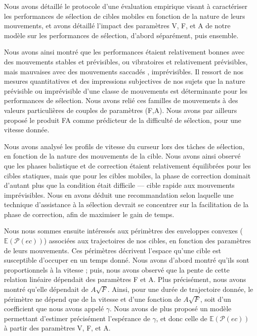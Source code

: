 	Nous avons détaillé le protocole d'une évaluation empirique visant à caractériser les performances de sélection de cibles mobiles en fonction de la nature de leurs mouvements, et avons détaillé l'impact des paramètres V, F, et A de notre modèle sur les performances de sélection, d'abord séparément, puis ensemble.
	
	Nous avons ainsi montré que les performances étaient relativement bonnes avec des mouvements \og stables \fg{} et prévisibles, ou \og vibratoires \fg{} et relativement prévisibles, mais mauvaises avec des mouvements \og saccadés \fg{}, imprévisibles. Il ressort de nos mesures quantitatives et des impressions subjectives de nos sujets que la nature prévisible ou imprévisible d'une classe de mouvements est déterminante pour les performances de sélection. Nous avons relié ces familles de mouvements à des valeurs particulières de couples de paramètres (F,A). Nous avons par ailleurs proposé le produit FA comme prédicteur de la difficulté de sélection, pour une vitesse donnée.
	
	Nous avons analysé les profils de vitesse du curseur lors des tâches de sélection, en fonction de la nature des mouvements de la cible. Nous avons ainsi observé que les phases balistique et de correction étaient relativement équilibrées pour les cibles statiques, mais que pour les cibles mobiles, la phase de correction dominait d'autant plus que la condition était difficile --- cible rapide aux mouvements imprévisibles. Nous en avons déduit une recommandation selon laquelle une technique d'assistance à la sélection devrait se concentrer sur la facilitation de la phase de correction, afin de maximiser le gain de temps.
	
	Nous nous sommes ensuite intéressés aux périmètres des enveloppes convexes ($\mathbb{E}(\mathcal{P}(ec))$) associées aux trajectoires de nos cibles, en fonction des paramètres de leurs mouvements. Ces périmètres décrivent l'espace qu'une cible est susceptible d'occuper en un temps donné. Nous avons d'abord montré qu'ils sont proportionnels à la vitesse ; puis, nous avons observé que la pente de cette relation linéaire dépendait des paramètres F et A. Plus précisément, nous avons montré qu'elle dépendait de $A\sqrt{F}$. Ainsi, pour une durée de trajectoire donnée, le périmètre ne dépend que de la vitesse et d'une fonction de $A\sqrt{F}$, soit d'un coefficient que nous avons appelé $\gamma$. Nous avons de plus proposé un modèle permettant d'estimer précisément l'espérance de $\gamma$, et donc celle de $\mathbb{E}(\mathcal{P}(ec))$ à partir des paramètres V, F, et A.
	
